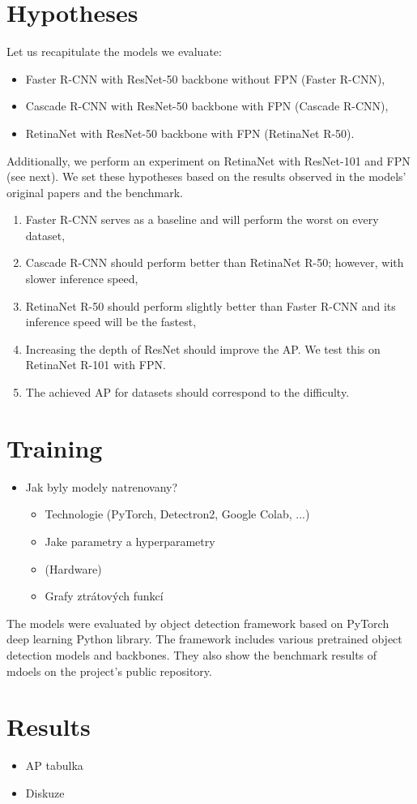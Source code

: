 \section{Hypotheses}
Let us recapitulate the models we evaluate:
\begin{itemize}
	\item Faster R-CNN with ResNet-50 backbone without FPN (Faster R-CNN),
	\item Cascade R-CNN with ResNet-50 backbone with FPN (Cascade R-CNN),
	\item RetinaNet with ResNet-50 backbone with FPN (RetinaNet R-50).
\end{itemize}
Additionally, we perform an experiment on RetinaNet with ResNet-101 and FPN
(see next). We set these hypotheses based on the results observed in the
models' original papers and the  benchmark.
\renewcommand{\theenumi}{\alph{enumi}}
\begin{enumerate}
	\item Faster R-CNN serves as a baseline and will perform the worst on every
	      dataset,
	\item Cascade R-CNN should perform better than RetinaNet R-50; however, with
	      slower inference speed,
	\item RetinaNet R-50 should perform slightly better than Faster R-CNN and
	      its inference speed will be the fastest,
	\item Increasing the depth of ResNet should improve the AP. We test this on
	      RetinaNet R-101 with FPN.
	\item The achieved AP for datasets should correspond to the difficulty.
\end{enumerate}

\section{Training}
\begin{itemize}
	\item Jak byly modely natrenovany?
	      \begin{itemize}
		      \item Technologie (PyTorch, Detectron2, Google Colab, ...)
		      \item Jake parametry a hyperparametry
		      \item (Hardware)
		      \item Grafy ztrátových funkcí
	      \end{itemize}
\end{itemize}
The models were evaluated by  object detection framework
\cite{detectron} based on PyTorch deep learning Python library. The framework
includes various pretrained object detection models and backbones. They also
show the benchmark results of mdoels on the project's public repository.



\section{Results}
\begin{itemize}
	\item AP tabulka
	\item Diskuze
\end{itemize}

